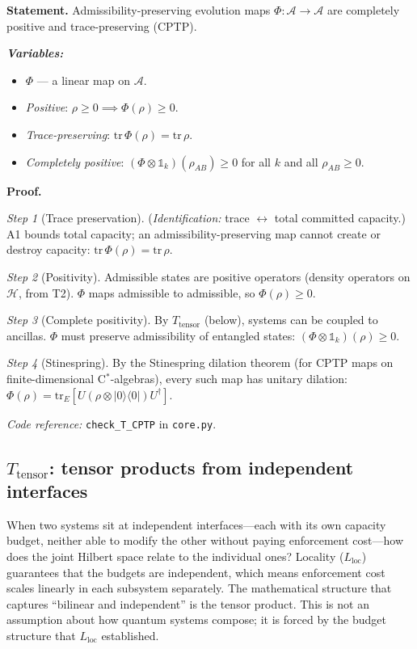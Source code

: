 \documentclass[11pt]{article}
\newenvironment{varlist}{\begin{itemize}[nosep,leftmargin=2em]}{\end{itemize}}
\newcommand{\coderef}[2]{\smallskip\noindent\textit{Code reference:} \texttt{#1} in \texttt{#2}.}
\begin{document}
\begin{tcolorbox}[apfbox, title={$T_{\mathrm{CPTP}}$: Completely Positive Trace-Preserving Maps}]
\textbf{Statement.}  Admissibility-preserving evolution maps $\Phi: \mathcal{A} \to \mathcal{A}$ are completely positive and trace-preserving (CPTP).

\smallskip\noindent\textbf{\textit{Variables:}}
\begin{varlist}
\item $\Phi$ --- a linear map on $\mathcal{A}$.
\item \textit{Positive}: $\rho \ge 0 \implies \Phi(\rho) \ge 0$.
\item \textit{Trace-preserving}: $\mathrm{tr}\,\Phi(\rho) = \mathrm{tr}\,\rho$.
\item \textit{Completely positive}: $(\Phi \otimes \mathbb{1}_k)(\rho_{AB}) \ge 0$ for all $k$ and all $\rho_{AB} \ge 0$.
\end{varlist}

\smallskip\noindent\textbf{Proof.}

\textit{Step 1} (Trace preservation).  (\textit{Identification:} trace $\leftrightarrow$ total committed capacity.)  A1 bounds total capacity; an admissibility-preserving map cannot create or destroy capacity: $\mathrm{tr}\,\Phi(\rho) = \mathrm{tr}\,\rho$.

\textit{Step 2} (Positivity).  Admissible states are positive operators (density operators on $\mathcal{H}$, from T2).  $\Phi$ maps admissible to admissible, so $\Phi(\rho) \ge 0$.

\textit{Step 3} (Complete positivity).  By $T_{\mathrm{tensor}}$ (below), systems can be coupled to ancillas.  $\Phi$ must preserve admissibility of entangled states: $(\Phi \otimes \mathbb{1}_k)(\rho) \ge 0$.

\textit{Step 4} (Stinespring).  By the Stinespring dilation theorem (for CPTP maps on finite-dimensional C$^*$-algebras), every such map has unitary dilation: $\Phi(\rho) = \mathrm{tr}_E[U(\rho \otimes |0\rangle\langle 0|)U^\dagger]$.

\coderef{check\_T\_CPTP}{core.py}
\end{tcolorbox}


\subsection{\texorpdfstring{$T_{\mathrm{tensor}}$}{T tensor}: tensor products from independent interfaces}

When two systems sit at independent interfaces---each with its own capacity budget, neither able to modify the other without paying enforcement cost---how does the joint Hilbert space relate to the individual ones?  Locality ($L_{\mathrm{loc}}$) guarantees that the budgets are independent, which means enforcement cost scales linearly in each subsystem separately.  The mathematical structure that captures ``bilinear and independent'' is the tensor product.  This is not an assumption about how quantum systems compose; it is forced by the budget structure that $L_{\mathrm{loc}}$ established.
\end{document}

